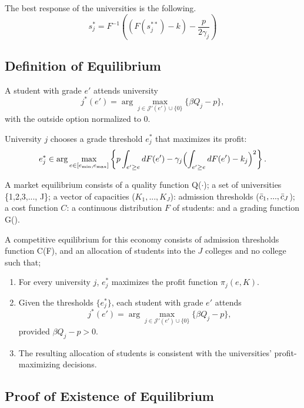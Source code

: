 The best response of the universities is the following.
\begin{equation*}
    s_j^* = F^{-1}\left((F(s_j^{**})-k)-\frac{p}{2\gamma_j}\right)
\end{equation*}

\subsection{Definition of Equilibrium}

\begin{definition}
A student with grade $e'$ attends university
\[
j^*(e') = \arg\max_{j \in \mathcal{J}'(e') \cup \{0\}} \{ \beta Q_j - p \},
\]
with the outside option normalized to $0$.
\end{definition}

\begin{definition}
University $j$ chooses a grade threshold $e_j^*$ that maximizes its profit:
\[
e_j^* \in \arg\max_{e\in [e_{\min}, e_{\max}]} \left\{ p \int_{e' \ge e} dF(e') - \gamma_j \Bigl(\int_{e' \ge e} dF(e') - k_j\Bigr)^2 \right\}.
\]
\end{definition}

\begin{definition}
A market equilibrium consists of a quality function Q($\cdot$); a set of universities \{1,2,3,..., J\}; a vector of capacities ($K_1, ..., K_J$): admission thresholds ($\Bar{c}_1, ..., \Bar{c}_J$); a cost function $C$: a continuous distribution $F$ of students: and a grading function G().

A competitive equilibrium for this economy consists of admission thresholds function C(F), and an allocation of students into the $J$ colleges and no college such that;
\begin{enumerate}
    \item For every university $j$, $e_j^*$ maximizes the profit function $\pi_j(e, K)$.
    \item Given the thresholds $\{e_j^*\}$, each student with grade $e'$ attends
    \[
    j^*(e') = \arg\max_{j \in \mathcal{J}'(e') \cup \{0\}} \{ \beta Q_j - p \},
    \]
    provided $\beta Q_j - p>0$.
    \item The resulting allocation of students is consistent with the universities' profit-maximizing decisions.
\end{enumerate}
\end{definition}

\subsection{Proof of Existence of Equilibrium}

